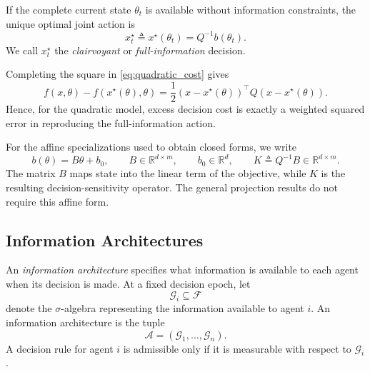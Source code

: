 \documentclass[11pt]{article}
\begin{document}
If the complete current state $\theta_t$ is available without information
constraints, the unique optimal joint action is
\begin{equation}
    x_t^\star
    \triangleq
    x^\star(\theta_t)
    =
    Q^{-1}b(\theta_t).
    \label{eq:clairvoyant}
\end{equation}
We call $x_t^\star$ the \emph{clairvoyant} or \emph{full-information}
decision.

Completing the square in \eqref{eq:quadratic_cost} gives
\begin{equation}
    f(x,\theta)-f(x^\star(\theta),\theta)
    =
    \frac{1}{2}
    \left(x-x^\star(\theta)\right)^\top
    Q
    \left(x-x^\star(\theta)\right).
    \label{eq:complete_square}
\end{equation}
Hence, for the quadratic model, excess decision cost is exactly a weighted
squared error in reproducing the full-information action.

For the affine specializations used to obtain closed forms, we write
\begin{equation}
    b(\theta)=B\theta+b_0,
    \qquad
    B\in\mathbb{R}^{d\times m},
    \qquad
    b_0\in\mathbb{R}^{d},
    \qquad
    K\triangleq Q^{-1}B\in\mathbb{R}^{d\times m}.
    \label{eq:affine_map_and_sensitivity}
\end{equation}
The matrix $B$ maps state into the linear term of the objective, while $K$ is
the resulting decision-sensitivity operator. The general projection results do
not require this affine form.


\subsection{Information Architectures}
\label{subsec:architectures}

An \emph{information architecture} specifies what information is available to
each agent when its decision is made. At a fixed decision epoch, let
\[
    \mathcal{G}_i\subseteq\mathcal{F}
\]
denote the $\sigma$-algebra representing the information available to agent
$i$. An information architecture is the tuple
\begin{equation}
    \mathcal{A}
    =
    (\mathcal{G}_1,\ldots,\mathcal{G}_n).
    \label{eq:architecture}
\end{equation}
A decision rule for agent $i$ is admissible only if it is measurable with
respect to $\mathcal{G}_i$.
\end{document}
